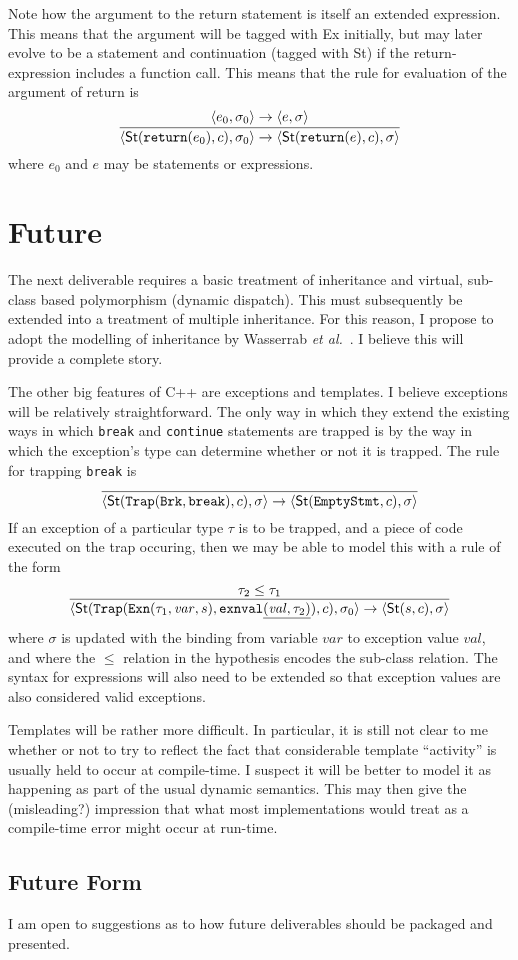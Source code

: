 \documentclass[11pt]{article}
\newcommand{\cpp}{\mbox{C\hspace{-0.5pt}+\hspace{-1.5pt}+}}
\begin{document}
Note how the argument to the return statement is itself an extended
expression.  This means that the argument will be tagged with
\textsf{Ex} initially, but may later evolve to be a statement and
continuation (tagged with \textsf{St}) if the return-expression
includes a function call.  This means that the rule for evaluation of
the argument of return is
\[
\infer{\langle \textsf{St}(\texttt{return}(e_0),c), \sigma_0\rangle
  \rightarrow
  \langle \textsf{St}(\texttt{return}(e),c),\sigma\rangle}{
  \langle e_0, \sigma_0\rangle \rightarrow \langle e,\sigma\rangle}
\]
where $e_0$ and $e$ may be statements or expressions.


\section{Future}

The next deliverable requires a basic treatment of inheritance and
virtual, sub-class based polymorphism (dynamic dispatch).  This must
subsequently be extended into a treatment of multiple inheritance.
For this reason, I propose to adopt the modelling of inheritance by
Wasserrab \emph{et al.}~\cite{wasserrab-nst-OOPSLA06}.  I believe this
will provide a complete story.

The other big features of \cpp{} are exceptions and templates.  I
believe exceptions will be relatively straightforward.  The only way
in which they extend the existing ways in which \texttt{break} and
\texttt{continue} statements are trapped is by the way in which the
exception's type can determine whether or not it is trapped.  The rule
for trapping \texttt{break} is
\[
\infer{\langle \textsf{St}(\texttt{Trap}(\texttt{Brk},\texttt{break}),
  c), \sigma\rangle\rightarrow
\langle \textsf{St}(\texttt{EmptyStmt}, c), \sigma\rangle}{}
\]
If an exception of a particular type $\tau$ is to be trapped, and a
piece of code executed on the trap occuring, then we may be able to
model this with a rule of the form
\[
\infer{\langle\textsf{St}(\texttt{Trap}(\texttt{Exn}(\tau_1,\mathit{var},s),\texttt{exnval}\underline{(\mathit{val},\tau_2)}),
  c), \sigma_0\rangle \rightarrow
  \langle\textsf{St}(s,c),\sigma\rangle}{\tau_2 \leq \tau_1}
\]
where $\sigma$ is updated with the binding from variable
$\mathit{var}$ to exception value $\mathit{val}$, and where the $\leq$
relation in the hypothesis encodes the sub-class relation.  The
syntax for expressions will also need to be extended so that exception
values are also considered valid exceptions.


Templates will be rather more difficult.  In particular, it is still
not clear to me whether or not to try to reflect the fact that
considerable template ``activity'' is usually held to occur at
compile-time.  I suspect it will be better to model it as happening as
part of the usual dynamic semantics.  This may then give the
(misleading?) impression that what most implementations would treat as
a compile-time error might occur at run-time.

\subsection{Future Form}
I am open to suggestions as to how future deliverables should be
packaged and presented.



\end{document}
